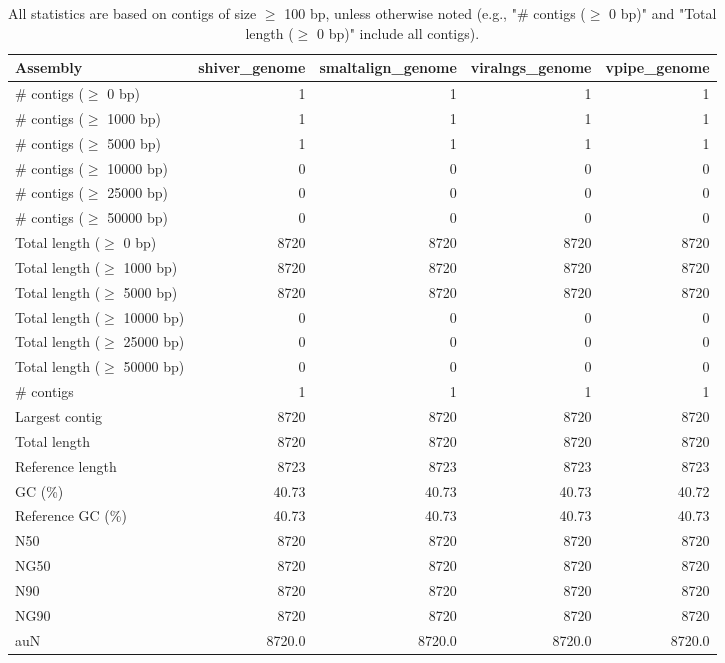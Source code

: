 \documentclass[12pt,a4paper]{article}
\begin{document}
\begin{table}[ht]
\begin{center}
\caption{All statistics are based on contigs of size $\geq$ 100 bp, unless otherwise noted (e.g., "\# contigs ($\geq$ 0 bp)" and "Total length ($\geq$ 0 bp)" include all contigs).}
\begin{tabular}{|l*{4}{|r}|}
\hline
Assembly & shiver\_genome & smaltalign\_genome & viralngs\_genome & vpipe\_genome \\ \hline
\# contigs ($\geq$ 0 bp) & 1 & 1 & 1 & 1 \\ \hline
\# contigs ($\geq$ 1000 bp) & 1 & 1 & 1 & 1 \\ \hline
\# contigs ($\geq$ 5000 bp) & 1 & 1 & 1 & 1 \\ \hline
\# contigs ($\geq$ 10000 bp) & 0 & 0 & 0 & 0 \\ \hline
\# contigs ($\geq$ 25000 bp) & 0 & 0 & 0 & 0 \\ \hline
\# contigs ($\geq$ 50000 bp) & 0 & 0 & 0 & 0 \\ \hline
Total length ($\geq$ 0 bp) & 8720 & 8720 & 8720 & 8720 \\ \hline
Total length ($\geq$ 1000 bp) & 8720 & 8720 & 8720 & 8720 \\ \hline
Total length ($\geq$ 5000 bp) & 8720 & 8720 & 8720 & 8720 \\ \hline
Total length ($\geq$ 10000 bp) & 0 & 0 & 0 & 0 \\ \hline
Total length ($\geq$ 25000 bp) & 0 & 0 & 0 & 0 \\ \hline
Total length ($\geq$ 50000 bp) & 0 & 0 & 0 & 0 \\ \hline
\# contigs & 1 & 1 & 1 & 1 \\ \hline
Largest contig & 8720 & 8720 & 8720 & 8720 \\ \hline
Total length & 8720 & 8720 & 8720 & 8720 \\ \hline
Reference length & 8723 & 8723 & 8723 & 8723 \\ \hline
GC (\%) & 40.73 & 40.73 & 40.73 & 40.72 \\ \hline
Reference GC (\%) & 40.73 & 40.73 & 40.73 & 40.73 \\ \hline
N50 & 8720 & 8720 & 8720 & 8720 \\ \hline
NG50 & 8720 & 8720 & 8720 & 8720 \\ \hline
N90 & 8720 & 8720 & 8720 & 8720 \\ \hline
NG90 & 8720 & 8720 & 8720 & 8720 \\ \hline
auN & 8720.0 & 8720.0 & 8720.0 & 8720.0 \\ \hline

\end{tabular}
\end{center}
\end{table}
\end{document}
